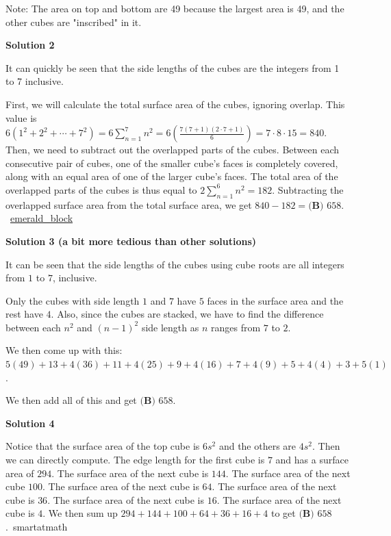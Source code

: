 \begin{enumerate}
 Note: The area on top and bottom are 49 because the largest area is 49, and the other cubes are "inscribed" in it.

 


 



\textbf{Solution 2}

It can quickly be seen that the side lengths of the cubes are the integers from 1 to 7 inclusive.

 First, we will calculate the total surface area of the cubes, ignoring overlap. This value is $6 ( 1^2 + 2^2 + \cdots + 7^2 ) = 6\sum_{n=1}^{7} n^2 = 6 \left( \frac{7(7 + 1)(2 \cdot 7 + 1)}{6} \right) = 7 \cdot 8 \cdot 15 = 840$. Then, we need to subtract out the overlapped parts of the cubes. Between each consecutive pair of cubes, one of the smaller cube's faces is completely covered, along with an equal area of one of the larger cube's faces. The total area of the overlapped parts of the cubes is thus equal to $2\sum_{n=1}^{6} n^2 = 182$. Subtracting the overlapped surface area from the total surface area, we get $840 - 182 = \boxed{\textbf{(B) }658}$. ~\href{https://artofproblemsolving.com/wiki/index.php?title=User:Emerald\_block}{emerald\_block}

 



\textbf{Solution 3 (a bit more tedious than other solutions)}

It can be seen that the side lengths of the cubes using cube roots are all integers from $1$ to $7$, inclusive.

 Only the cubes with side length $1$ and $7$ have $5$ faces in the surface area and the rest have $4$. Also, since the cubes are stacked, we have to find the difference between each $n^2$ and $(n-1)^2$ side length as $n$ ranges from $7$ to $2$. 

 We then come up with this: $5(49)+13+4(36)+11+4(25)+9+4(16)+7+4(9)+5+4(4)+3+5(1)$. 

 We then add all of this and get $\boxed{\textbf{(B) }658}$.

 



\textbf{Solution 4}

Notice that the surface area of the top cube is $6s^2$ and the others are $4s^2$. Then we can directly compute. The edge length for the first cube is $7$ and has a surface area of $294$. The surface area of the next cube is $144$. The surface area of the next cube $100$. The surface area of the next cube is $64$. The surface area of the next cube is $36$. The surface area of the next cube is $16$. The surface area of the next cube is $4$. We then sum up $294+144+100+64+36+16+4$ to get $\boxed{\textbf{(B) }658}$.~smartatmath


\end{enumerate}
